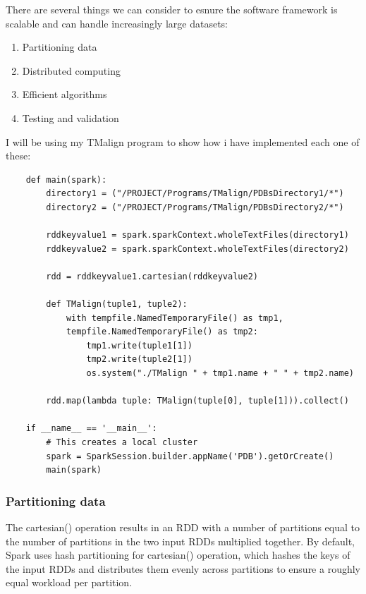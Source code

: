\documentclass[]{final_report}
\begin{document}
There are several things we can consider to esnure the software framework is scalable and can handle increasingly large datasets:

\begin{enumerate}
    \item Partitioning data
    \item Distributed computing
    \item Efficient algorithms
    \item Testing and validation
\end{enumerate}

I will be using my TMalign program to show how i have implemented each one of these:


\begin{lstlisting}
    def main(spark):
        directory1 = ("/PROJECT/Programs/TMalign/PDBsDirectory1/*")
        directory2 = ("/PROJECT/Programs/TMalign/PDBsDirectory2/*")

        rddkeyvalue1 = spark.sparkContext.wholeTextFiles(directory1)
        rddkeyvalue2 = spark.sparkContext.wholeTextFiles(directory2)

        rdd = rddkeyvalue1.cartesian(rddkeyvalue2)

        def TMalign(tuple1, tuple2):
            with tempfile.NamedTemporaryFile() as tmp1, 
            tempfile.NamedTemporaryFile() as tmp2:
                tmp1.write(tuple1[1])
                tmp2.write(tuple2[1])
                os.system("./TMalign " + tmp1.name + " " + tmp2.name)

        rdd.map(lambda tuple: TMalign(tuple[0], tuple[1])).collect()
            
    if __name__ == '__main__':
        # This creates a local cluster
        spark = SparkSession.builder.appName('PDB').getOrCreate()
        main(spark)
\end{lstlisting}

\clearpage

\subsubsection{Partitioning data}
The cartesian() operation results in an RDD with a number of partitions equal to the number of partitions in the two input RDDs multiplied together. By default, Spark uses hash partitioning for cartesian() operation, which hashes the keys of the input RDDs and distributes them evenly across partitions to ensure a roughly equal workload per partition.
\end{document}
